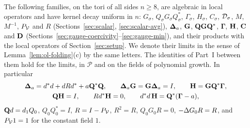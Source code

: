 \begin{corollary}\label{cor:ol-part-one}
The following families, on the tori of all sides $n\ge8$, are algebraic in local operators and have kernel decay uniform in $n$: $G_\sigma$, $Q_\sigma G_\sigma Q_\sigma^*$, $\Gamma_\sigma$, $H_\sigma$, $C_\sigma$, $\mathcal D_\sigma$, $M$, $M^{-1}$, $P_\mathcal V$ and $R$ (Sections~\ref{sec:scalar}, \ref{sec:scalar-avg}), $\boldsymbol{\Delta}_a$, $\mathbf G$, $\mathbf Q\mathbf G\mathbf Q^*$, $\boldsymbol\Gamma$, $\mathbf H$, $\mathbf C$ and $\mathbf D$ (Sections~\ref{sec:gauge-coercivity}--\ref{sec:gauge-min}), and their products with the local operators of Section~\ref{sec:setup}. We denote their limits in the sense of Lemma~\ref{lem:ol-folding}(c) by the same letters. The identities of Part~I between them hold for the limits, in $\mathscr P$ and on the fields of polynomial growth. In particular
\[
\begin{gathered}
\boldsymbol{\Delta}_a=d^*d+dRd^*+a\mathbf Q^*\mathbf Q,\qquad\boldsymbol{\Delta}_a\mathbf G=\mathbf G\boldsymbol{\Delta}_a=I,\qquad\mathbf H=\mathbf G\mathbf Q^*\boldsymbol\Gamma,\\
\mathbf Q\mathbf H=I,\qquad Rd^*\mathbf H=0,\qquad d^*d\,\mathbf H=\mathbf Q^*(\boldsymbol\Gamma-a),
\end{gathered}
\]
$\mathbf Q d=d_1 Q_0$, $Q_0Q_0^*=I$, $R=I-P_\mathcal V$, $R^2=R$, $Q_0G_0R=0$, $-\Delta G_0R=R$, and $P_\mathcal V1=1$ for the constant field $1$.
\end{corollary}

